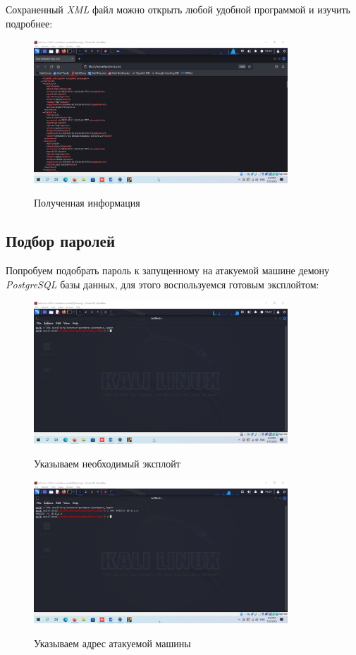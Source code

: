 \documentclass[a4paper]{article}
\begin{document}
  Сохраненный \textit{XML} файл можно открыть любой удобной программой и изучить подробнее:

  \begin{figure}[H]
    \centering
    \includegraphics[width=0.85\textwidth]{04_0048}
    \label{img:48}
    \caption{Полученная информация}
  \end{figure}

  \subsection{Подбор паролей}

  Попробуем подобрать пароль к запущенному на атакуемой машине демону
  \textit{PostgreSQL} базы данных, для этого воспользуемся готовым эксплойтом:

  \begin{figure}[H]
    \centering
    \includegraphics[width=0.85\textwidth]{04_0049}
    \label{img:49}
    \caption{Указываем необходимый эксплойт}
  \end{figure}

  \begin{figure}[H]
    \centering
    \includegraphics[width=0.85\textwidth]{04_0050}
    \label{img:50}
    \caption{Указываем адрес атакуемой машины}
  \end{figure}
\end{document}
